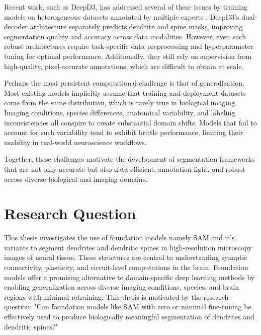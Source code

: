 Recent work, such as \gls{DeepD3}, has addressed several of these issues by training models on heterogeneous datasets annotated by multiple experts \cite{Fernholz_2024}. \gls{DeepD3}’s dual-decoder architecture separately predicts dendrite and spine masks, improving segmentation quality and accuracy across data modalities. However, even such robust architectures require task-specific data preprocessing and hyperparameter tuning for optimal performance. Additionally, they still rely on supervision from high-quality, pixel-accurate annotations, which are difficult to obtain at scale.

Perhaps the most persistent computational challenge is that of generalization. Most existing models \cite{Xiao_2018,Rodriguez_2008,Vidaurre_2022,Fernholz_2024} implicitly assume that training and deployment datasets come from the same distribution, which is rarely true in biological imaging. Imaging conditions, species differences, anatomical variability, and labeling inconsistencies all conspire to create substantial domain shifts. Models that fail to account for such variability tend to exhibit brittle performance, limiting their usability in real-world neuroscience workflows.

Together, these challenges motivate the development of segmentation frameworks that are not only accurate but also data-efficient, annotation-light, and robust across diverse biological and imaging domains.

\section{Research Question}
This thesis investigates the use of foundation models namely \gls{SAM} \cite{Kirillov_2023} and it's variants to segment dendrites and dendritic spines in high-resolution microscopy images of neural tissue. These structures are central to understanding synaptic connectivity, plasticity, and circuit-level computations in the brain. Foundation models offer a promising alternative to domain-specific deep learning methods by enabling generalization across diverse imaging conditions, species, and brain regions with minimal retraining. This thesis is motivated by the research question: "Can foundation models like \gls{SAM} with zero or minimal fine-tuning be effectively used to produce biologically meaningful segmentation of dendrites and dendritic spines?"



